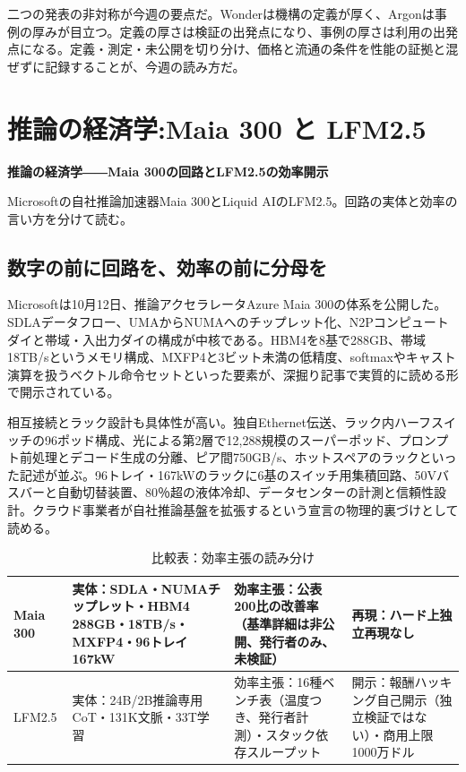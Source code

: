 \documentclass[lualatex,a4paper,10pt]{jlreq}
\begin{document}
二つの発表の非対称が今週の要点だ。Wonderは機構の定義が厚く、Argonは事例の厚みが目立つ。定義の厚さは検証の出発点になり、事例の厚さは利用の出発点になる。定義・測定・未公開を切り分け、価格と流通の条件を性能の証拠と混ぜずに記録することが、今週の読み方だ。
\cite{B01,B04,B05,B02,B06,B07,B03,B08}


\section{推論の経済学:Maia 300 と LFM2.5}
\label{sec:P2}

{\Large\bfseries 推論の経済学――Maia 300の回路とLFM2.5の効率開示\par}
\smallskip
{\color{SurveyMuted}Microsoftの自社推論加速器Maia 300とLiquid AIのLFM2.5。回路の実体と効率の言い方を分けて読む。\par}
\bigskip

\subsection*{数字の前に回路を、効率の前に分母を}

Microsoftは10月12日、推論アクセラレータAzure Maia 300の体系を公開した。SDLAデータフロー、UMAからNUMAへのチップレット化、N2Pコンピュートダイと帯域・入出力ダイの構成が中核である。HBM4を8基で288GB、帯域18TB/sというメモリ構成、MXFP4と3ビット未満の低精度、softmaxやキャスト演算を扱うベクトル命令セットといった要素が、深掘り記事で実質的に読める形で開示されている。
\cite{B09,B10}


相互接続とラック設計も具体性が高い。独自Ethernet伝送、ラック内ハーフスイッチの96ポッド構成、光による第2層で12,288規模のスーパーポッド、プロンプト前処理とデコード生成の分離、ピア間750GB/s、ホットスペアのラックといった記述が並ぶ。96トレイ・167kWのラックに6基のスイッチ用集積回路、50Vバスバーと自動切替装置、80％超の液体冷却、データセンターの計測と信頼性設計。クラウド事業者が自社推論基盤を拡張するという宣言の物理的裏づけとして読める。
\cite{B09,B10}


\begin{table}[htbp]\centering\footnotesize
\caption{比較表：効率主張の読み分け}
\begin{tabularx}{0.96\linewidth}{@{}lXXX@{}}
\toprule
Maia 300 & 実体：SDLA・NUMAチップレット・HBM4 288GB・18TB/s・MXFP4・96トレイ167kW & 効率主張：公表200比の改善率（基準詳細は非公開、発行者のみ、未検証） & 再現：ハード上独立再現なし \cite{B09,B10} \\
\midrule
LFM2.5 & 実体：24B/2B推論専用CoT・131K文脈・33T学習 & 効率主張：16種ベンチ表（温度つき、発行者計測）・スタック依存スループット & 開示：報酬ハッキング自己開示（独立検証ではない）・商用上限1000万ドル \cite{B11,B12} \\
\bottomrule
\end{tabularx}
\end{table}
\end{document}
